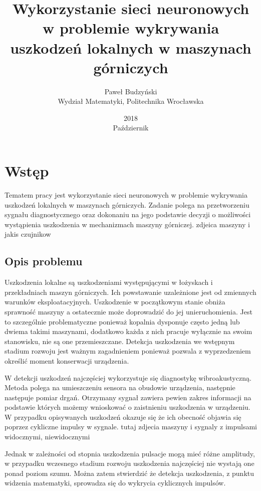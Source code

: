 \documentclass[12pt, a4paper, oneside]{article}
\author{Paweł Budzyński \\ Wydział Matematyki, Politechnika Wrocławska}
\title{\textbf{Wykorzystanie sieci neuronowych w problemie wykrywania uszkodzeń lokalnych w maszynach górniczych}}
\date{2018 \\ Październik}
\newcommand{\mychapter}[2]{
	\setcounter{chapter}{#1}
	\setcounter{section}{0}
	\chapter*{#2}
	\addcontentsline{toc}{chapter}{#2}
}
\begin{document}
	\maketitle
	\newpage
	\section{Wstęp}
	Tematem pracy jest wykorzystanie sieci neuronowych w problemie wykrywania uszkodzeń lokalnych w maszynach górniczych. Zadanie polega na przetworzeniu sygnału diagnostycznego oraz dokonaniu na jego podstawie decyzji o możliwości wystąpienia uszkodzenia w mechanizmach maszyny górniczej.
	{\Huge zdjeica maszyny i jakis czujnikow}
	
	\subsection{Opis problemu}
	
	Uszkodzenia lokalne są uszkodzeniami występującymi w łożyskach i przekładniach maszyn górniczych. Ich powstawanie uzależnione jest od zmiennych warunków eksploatacyjnych. Uszkodzenie w początkowym stanie obniża sprawność maszyny a ostatecznie może doprowadzić do jej unieruchomienia. Jest to szczególnie problematyczne ponieważ kopalnia dysponuje często jedną lub dwiema takimi maszynami, dodatkowo każda z nich pracuje wyłącznie na swoim stanowisku, nie są one przemieszczane. Detekcja uszkodzenia we wstępnym stadium rozwoju jest ważnym zagadnieniem ponieważ pozwala z wyprzedzeniem określić moment konserwacji urządzenia. 
	
		W detekcji uszkodzeń najczęściej wykorzystuje się diagnostykę wibroakustyczną. Metoda polega na umieszczeniu sensora na obudowie urządzenia, następnie następuje pomiar drgań. Otrzymany sygnał zawiera pewien zakres informacji na podstawie których możemy wnioskować o zaistnieniu uszkodzenia w urządzeniu. W przypadku opisywanych uszkodzeń okazuje się że ich obecność objawia się poprzez cykliczne impulsy w sygnale.
	{\LARGE tutaj zdjecia maszyny i sygnaly z impulsami widocznymi, niewidocznymi}
	
	Jednak w zależności od stopnia uszkodzenia pulsacje mogą mieć różne amplitudy, w przypadku wczesnego stadium rozwoju uszkodzenia najczęściej nie wystają one ponad poziom szumu.
	Można zatem stwierdzić że detekcja uszkodzenia, z punktu widzenia matematyki, sprowadza się do wykrycia cyklicznych impulsów. 
	
	
\end{document}

